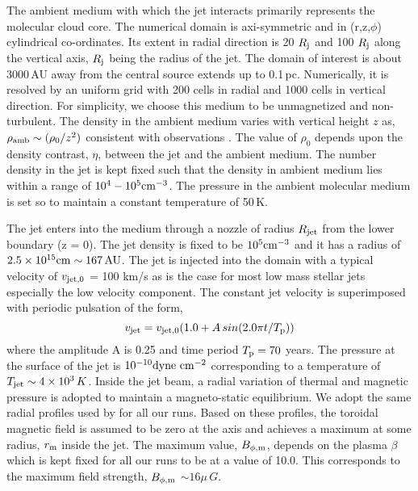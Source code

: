 \documentclass[useAMS,usenatbib,letters]{mn2e}
\begin{document}
The ambient medium with which the jet interacts primarily
represents the molecular cloud core. The numerical domain is axi-symmetric
and in (r,z,$\phi$) cylindrical co-ordinates. Its extent in radial
direction is 20 $R_{\rm j}$ and 100
$R_{\rm j}$ along the vertical axis, $R_{\rm j}$ being the radius of
the jet. The domain of interest is about 3000\,AU away from the
central source extends up to 0.1\,pc. Numerically, it is resolved by an uniform grid with 200 cells in
radial and 1000 cells in vertical direction. For simplicity, we choose this medium
to be unmagnetized and non-turbulent. The density in the ambient
medium varies with vertical height $z$ as, $\rho_{\rm amb}\sim (\rho_0/z^{2})$
consistent with observations \citep{Caselli:2011p13935}. The value of
$\rho_0$ depends upon the density contrast, $\eta$, between the jet and
the ambient medium. The number density in the jet is kept fixed such
that the density in ambient medium lies within a range of $10^{4}-10^{5}
\rm cm^{-3}$. The pressure in the ambient molecular medium is
set so to maintain a constant temperature of 50\,K. 
%

The jet enters into the medium through a nozzle of radius $R_{\rm jet}$
from the lower boundary (z = 0). The jet density is fixed to
be $10^{5} \rm cm^{-3}$ and it has a radius of $2.5\times10^{15} \rm cm \sim
167\,AU$. The jet is injected into the domain with a typical 
velocity of $v_{\rm jet,0}$ = 100 km/s as is the case for most low mass stellar jets
especially the low velocity component. The constant jet velocity is
superimposed with periodic pulsation of the form,
\begin{equation}
v_{\rm jet} = v_{\rm jet,0}(1.0 + A\,sin(2.0\pi t/T_{\rm p}))
\end{equation}
where the amplitude A is 0.25 and time period $T_{\rm p} = 70$
years. The pressure at the surface of the jet is $10^{-10} \rm
dyne\,\,cm^{-2}$ corresponding to a temperature of $T_{\rm jet} \sim
4\times10^{3}\,K$. Inside the jet beam, a radial variation of thermal
and magnetic pressure is adopted to maintain a magneto-static
equilibrium. We adopt the
same radial profiles used by \cite{Stone:2000p2650} for all our runs. 
Based on these profiles, the toroidal magnetic field is assumed to be
zero at the axis and achieves a maximum at some radius, $r_{\rm m}$
inside the jet. The maximum value, $B_{\phi,\rm m}$, depends on the
plasma $\beta$ which is kept fixed for all our runs to be at a value
of 10.0. This corresponds to the maximum field strength, $B_{\phi,\rm m}$ $\sim
16\mu\,G$.
\end{document}
